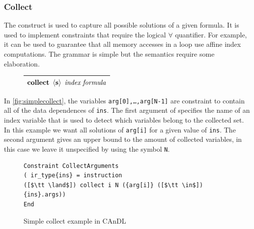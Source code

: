 \subsubsection{Collect}

    The  construct is used to capture all possible solutions
    of a given formula.
    It is used to implement constraints that require the logical $\forall$
    quantifier.
    For example, it can be used to guarantee that all memory accesses in a loop
    use affine index computations.
    The grammar is simple but the semantics require some elaboration.
\begin{figure}[H]
    \centering
    \begin{tabular}{|c|}
        \hline
        $\text{\bf collect}\ \left<\text{\bf s}\right>\ \text{\it index}\ \text{\it formula}$\\
        \hline
    \end{tabular}
\end{figure}

    \noindent
    In \autoref{fig:simplecollect}, the variables \texttt{arg[0],\dots,arg[N-1]}
    are constraint to contain all of the data dependences of \texttt{ins}.
    The first argument of  specifies the name of an index
    variable that is used to detect which variables belong to the collected set.
    In this example we want all solutions of \texttt{arg[i]} for a given value
    of \texttt{ins}.
    The second argument gives an upper bound to the amount of collected
    variables, in this case we leave it unspecified by using the symbol
    \texttt{N}.

\begin{figure}[ht]
\begin{lstlisting}[language=CAnDL]
Constraint CollectArguments
( ir_type{ins} = instruction
([$\tt \land$]) collect i N ({arg[i]} ([$\tt \in$]) {ins}.args))
End
\end{lstlisting}
\vspace{-0.3cm}
\caption{Simple collect example in CAnDL}
\label{fig:simplecollect}
\end{figure}

